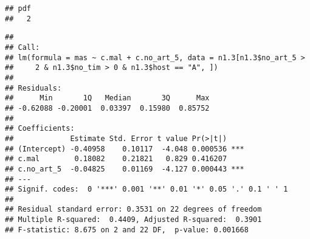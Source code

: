 \documentclass[]{article}
\newenvironment{Shaded}{\begin{snugshade}}{\end{snugshade}}
\newcommand{\KeywordTok}[1]{\textcolor[rgb]{0.13,0.29,0.53}{\textbf{#1}}}
\newcommand{\DataTypeTok}[1]{\textcolor[rgb]{0.13,0.29,0.53}{#1}}
\newcommand{\DecValTok}[1]{\textcolor[rgb]{0.00,0.00,0.81}{#1}}
\newcommand{\StringTok}[1]{\textcolor[rgb]{0.31,0.60,0.02}{#1}}
\newcommand{\CommentTok}[1]{\textcolor[rgb]{0.56,0.35,0.01}{\textit{#1}}}
\newcommand{\OperatorTok}[1]{\textcolor[rgb]{0.81,0.36,0.00}{\textbf{#1}}}
\newcommand{\NormalTok}[1]{#1}
\begin{document}
\begin{verbatim}
## pdf 
##   2
\end{verbatim}

\begin{Shaded}
\end{Shaded}

\begin{verbatim}
## 
## Call:
## lm(formula = mas ~ c.mal + c.no_art_5, data = n1.3[n1.3$no_art_5 > 
##     2 & n1.3$no_tim > 0 & n1.3$host == "A", ])
## 
## Residuals:
##      Min       1Q   Median       3Q      Max 
## -0.62088 -0.20001  0.03397  0.15980  0.85752 
## 
## Coefficients:
##             Estimate Std. Error t value Pr(>|t|)    
## (Intercept) -0.40958    0.10117  -4.048 0.000536 ***
## c.mal        0.18082    0.21821   0.829 0.416207    
## c.no_art_5  -0.04825    0.01169  -4.127 0.000443 ***
## ---
## Signif. codes:  0 '***' 0.001 '**' 0.01 '*' 0.05 '.' 0.1 ' ' 1
## 
## Residual standard error: 0.3531 on 22 degrees of freedom
## Multiple R-squared:  0.4409, Adjusted R-squared:  0.3901 
## F-statistic: 8.675 on 2 and 22 DF,  p-value: 0.001668
\end{verbatim}
\end{document}
